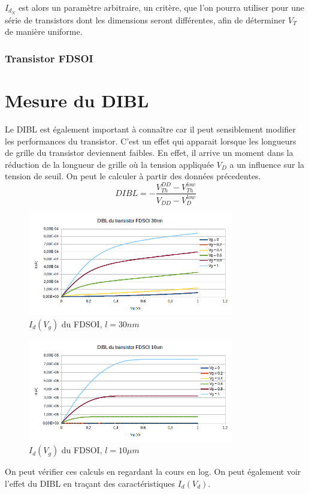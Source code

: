 \documentclass[a4paper,11pt]{report}
\begin{document}
$I_{d_{N}}$ est alors un paramètre arbitraire, un critère, que l'on pourra utiliser pour une série de transistors dont les dimensions seront différentes, afin de déterminer $V_T$ de manière uniforme.


\subsection{Transistor FDSOI}


\chapter{Mesure du DIBL}
Le DIBL est également important à connaître car il peut sensiblement modifier les performances du transistor. C'est un effet qui apparait lorsque les  longueurs de grille du transistor deviennent faibles. En effet, il arrive un moment dans la réduction de la longueur de grille où la tension appliquée $V_D$ a un influence sur la tension de seuil.
On peut le calculer à partir des données précedentes.
\[ DIBL = -\frac{V^{DD}_{Th} - V^{low}_{Th}}{V_{DD} - V^{low}_{D}}
\]

\begin{figure}[h]
    \begin{center}
        \includegraphics[width=0.8\textwidth]{Images/DIBL-11-30}
        \caption{$I_d(V_g)$ du FDSOI, $l = 30nm$}
        \label{DIBL_fdsoi_30nm}
    \end{center}
\end{figure}


\begin{figure}[h]
    \begin{center}
        \includegraphics[width=0.8\textwidth]{Images/DIBL-1-10}
        \caption{$I_d(V_g)$ du FDSOI, $l =10\mu m$}
        \label{DIBL_fdsoi_10um}
    \end{center}
\end{figure}
On peut vérifier ces calculs en regardant la cours en log.
On peut également voir l'effet du DIBL en traçant des caractéristiques $I_d(V_d)$.
\end{document}
